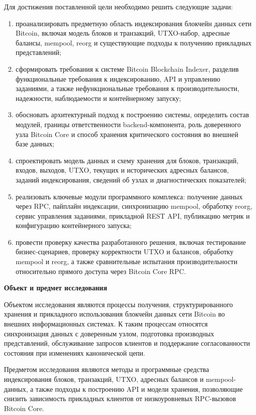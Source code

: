 Для достижения поставленной цели необходимо решить следующие задачи:
\begin{enumerate}
    \item проанализировать предметную область индексирования блокчейн данных
    сети Bitcoin, включая модель блоков и транзакций, UTXO-набор, адресные
    балансы, mempool, reorg и существующие подходы к получению прикладных
    представлений;
    \item сформировать требования к системе Bitcoin Blockchain Indexer,
    разделив функциональные требования к индексированию, API и управлению
    заданиями, а также нефункциональные требования к производительности,
    надежности, наблюдаемости и контейнерному запуску;
    \item обосновать архитектурный подход к построению системы, определить
    состав модулей, границы ответственности backend-компонента, роль
    доверенного узла Bitcoin Core и способ хранения критического состояния во
    внешней базе данных;
    \item спроектировать модель данных и схему хранения для блоков,
    транзакций, входов, выходов, UTXO, текущих и исторических адресных
    балансов, заданий индексирования, сведений об узлах и диагностических
    показателей;
    \item реализовать ключевые модули программного комплекса: получение данных
    через RPC, пайплайн индексации, синхронизацию mempool, обработку reorg,
    сервис управления заданиями, прикладной REST API, публикацию метрик и
    конфигурацию контейнерного запуска;
    \item провести проверку качества разработанного решения, включая
    тестирование бизнес-сценариев, проверку корректности UTXO и балансов,
    обработку mempool и reorg, а также сравнительные испытания
    производительности относительно прямого доступа через Bitcoin Core RPC.
\end{enumerate}

\textbf{Объект и предмет исследования}

Объектом исследования являются процессы получения, структурированного хранения
и прикладного использования блокчейн данных сети Bitcoin во внешних
информационных системах. К таким процессам относятся синхронизация данных с
доверенным узлом, подготовка производных представлений, обслуживание запросов
клиентов и поддержание согласованности состояния при изменениях канонической
цепи.

Предметом исследования являются методы и программные средства индексирования
блоков, транзакций, UTXO, адресных балансов и mempool-данных, а также подходы к
построению API и модели хранения, позволяющие снизить зависимость прикладных
клиентов от низкоуровневых RPC-вызовов Bitcoin Core.

